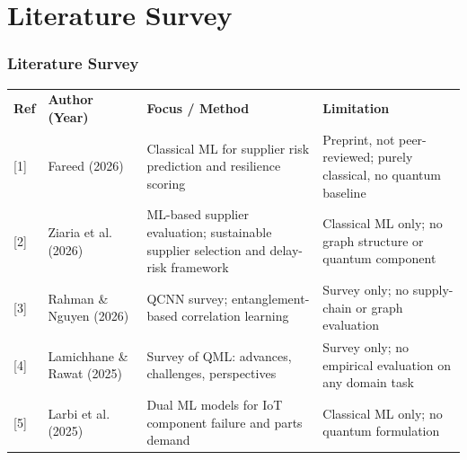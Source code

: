 \documentclass{beamer}
\newcommand{\tabfont}{\scriptsize}
\newcommand{\rowgap}{\addlinespace[4pt]}
\begin{document}
\section[Literature]{Literature Survey}
\begin{frame}[t,shrink=12]
\frametitle{Literature Survey}
\tabfont
\centering
\begin{tabularx}{\linewidth}{@{}>{\raggedright\arraybackslash}p{0.6cm}
                               >{\raggedright\arraybackslash}p{2.2cm}
                               >{\raggedright\arraybackslash}X
                               >{\raggedright\arraybackslash}X@{}}
\multicolumn{4}{@{}c@{}}{\textbf{Table 1: Literature Survey}} \\
\toprule
\textbf{Ref} & \textbf{Author (Year)} & \textbf{Focus / Method} & \textbf{Limitation} \\
\midrule
{[1]} & Fareed (2026) &
Classical ML for supplier risk prediction and resilience scoring &
Preprint, not peer-reviewed; purely classical, no quantum baseline \\ \rowgap

[2] & Ziaria et al. (2026) &
ML-based supplier evaluation; sustainable supplier selection and delay-risk framework &
Classical ML only; no graph structure or quantum component \\ \rowgap

[3] & Rahman \& Nguyen (2026) &
QCNN survey; entanglement-based correlation learning &
Survey only; no supply-chain or graph evaluation \\ \rowgap

[4] & Lamichhane \& Rawat (2025) &
Survey of QML: advances, challenges, perspectives &
Survey only; no empirical evaluation on any domain task \\ \rowgap

[5] & Larbi et al. (2025) &
Dual ML models for IoT component failure and parts demand &
Classical ML only; no quantum formulation \\
\bottomrule
\end{tabularx}
\end{frame}
\end{document}

